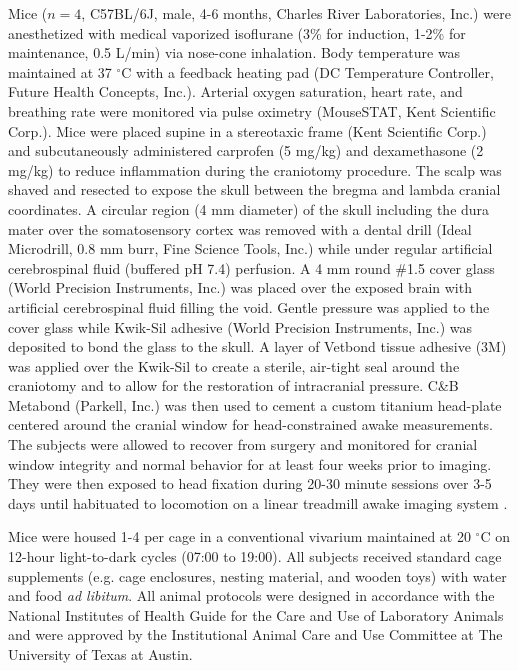 \documentclass[12pt]{spieman}
\begin{document}
\begin{spacing}{2}
Mice ($n = 4$, C57BL/6J, male, 4-6 months, Charles River Laboratories, Inc.) were anesthetized with medical  vaporized isoflurane (3\% for induction, 1-2\% for maintenance, 0.5 L/min) via nose-cone inhalation. Body temperature was maintained at 37 $^\circ$C with a feedback heating pad (DC Temperature Controller, Future Health Concepts, Inc.). Arterial oxygen saturation, heart rate, and breathing rate were monitored via pulse oximetry (MouseSTAT, Kent Scientific Corp.). Mice were placed supine in a stereotaxic frame (Kent Scientific Corp.) and subcutaneously administered carprofen (5 mg/kg) and dexamethasone (2 mg/kg) to reduce inflammation during the craniotomy procedure. The scalp was shaved and resected to expose the skull between the bregma and lambda cranial coordinates. A circular region (4 mm diameter) of the skull including the dura mater over the somatosensory cortex was removed with a dental drill (Ideal Microdrill, 0.8 mm burr, Fine Science Tools, Inc.) while under regular artificial cerebrospinal fluid (buffered pH 7.4) perfusion. A 4 mm round \#1.5 cover glass (World Precision Instruments, Inc.) was placed over the exposed brain with artificial cerebrospinal fluid filling the void. Gentle pressure was applied to the cover glass while Kwik-Sil adhesive (World Precision Instruments, Inc.) was deposited to bond the glass to the skull. A layer of Vetbond tissue adhesive (3M) was applied over the Kwik-Sil to create a sterile, air-tight seal around the craniotomy and to allow for the restoration of intracranial pressure. C\&B Metabond (Parkell, Inc.) was then used to cement a custom titanium head-plate centered around the cranial window for head-constrained awake measurements. The subjects were allowed to recover from surgery and monitored for cranial window integrity and normal behavior for at least four weeks prior to imaging. They were then exposed to head fixation during 20-30 minute sessions over 3-5 days until habituated to locomotion on a linear treadmill awake imaging system \cite{He:2020}.

Mice were housed 1-4 per cage in a conventional vivarium maintained at 20 $^\circ$C on 12-hour light-to-dark cycles (07:00 to 19:00). All subjects received standard cage supplements (e.g. cage enclosures, nesting material, and wooden toys) with water and food \textit{ad libitum}. All animal protocols were designed in accordance with the National Institutes of Health Guide for the Care and Use of Laboratory Animals and were approved by the Institutional Animal Care and Use Committee at The University of Texas at Austin.


\end{spacing}
\end{document}
